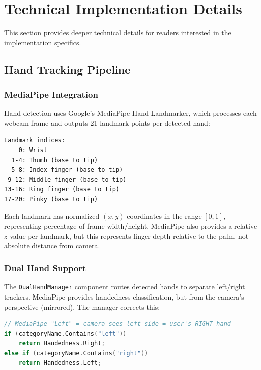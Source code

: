 \documentclass[11pt]{article}
\begin{document}
\section{Technical Implementation Details}

This section provides deeper technical details for readers interested in the implementation specifics.

\subsection{Hand Tracking Pipeline}

\subsubsection{MediaPipe Integration}

Hand detection uses Google's MediaPipe Hand Landmarker, which processes each webcam frame and outputs 21 landmark points per detected hand:

\begin{verbatim}
Landmark indices:
    0: Wrist
  1-4: Thumb (base to tip)
  5-8: Index finger (base to tip)
 9-12: Middle finger (base to tip)
13-16: Ring finger (base to tip)
17-20: Pinky (base to tip)
\end{verbatim}

Each landmark has normalized $(x, y)$ coordinates in the range $[0, 1]$, representing percentage of frame width/height. MediaPipe also provides a relative $z$ value per landmark, but this represents finger depth relative to the palm, not absolute distance from camera.


\subsubsection{Dual Hand Support}

The \texttt{DualHandManager} component routes detected hands to separate left/right trackers. MediaPipe provides handedness classification, but from the camera's perspective (mirrored). The manager corrects this:

\begin{lstlisting}[language=C, caption=Handedness Correction]
// MediaPipe "Left" = camera sees left side = user's RIGHT hand
if (categoryName.Contains("left"))
    return Handedness.Right;
else if (categoryName.Contains("right"))
    return Handedness.Left;
\end{lstlisting}
\end{document}

